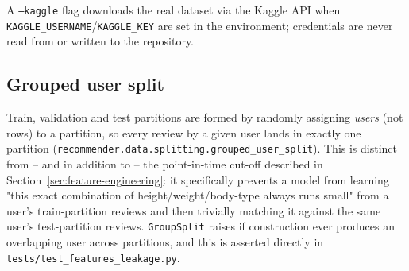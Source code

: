 A \texttt{--kaggle} flag downloads the real dataset via the Kaggle API when
\texttt{KAGGLE\_USERNAME}/\texttt{KAGGLE\_KEY} are set in the environment;
credentials are never read from or written to the repository.

\subsection{Grouped user split}

Train, validation and test partitions are formed by randomly assigning
\emph{users} (not rows) to a partition, so every review by a given user lands
in exactly one partition
(\texttt{recommender.data.splitting.grouped\_user\_split}). This is distinct
from -- and in addition to -- the point-in-time cut-off described in
Section~\ref{sec:feature-engineering}: it specifically prevents a model from
learning "this exact combination of height/weight/body-type always runs
small" from a user's train-partition reviews and then trivially matching it
against the same user's test-partition reviews. \texttt{GroupSplit} raises if
construction ever produces an overlapping user across partitions, and this is
asserted directly in \texttt{tests/test\_features\_leakage.py}.
